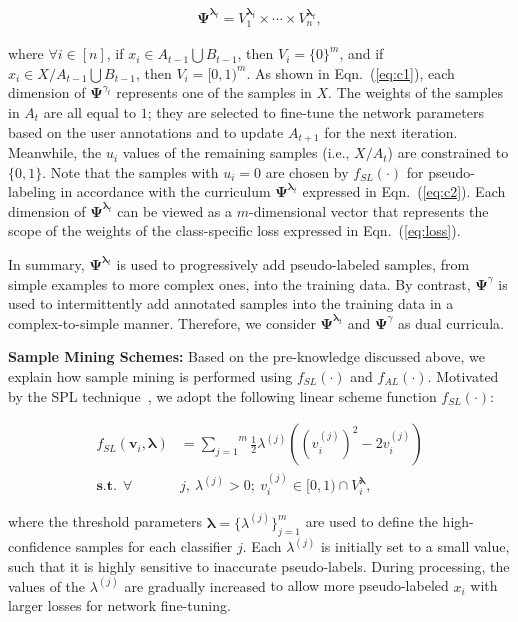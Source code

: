 \documentclass[journal]{IEEEtran}
\begin{document}
{\begin{small}\begin{equation}
\begin{aligned}
\mathbf{\Psi}^{{\bm \lambda}_t}= V^{\bm \lambda_t}_1\times\cdots\times V^{\bm \lambda_t}_n,\label{eq:c2}
\end{aligned}
\end{equation}\end{small}where $\forall i\in[n]$, if $x_i\in A_{t-1}\bigcup B_{t-1}$, then $V_i=\{0\}^m$, and if $x_i\in X/A_{t-1}\bigcup B_{t-1}$, then $V_i=[0,1)^m$. As shown in Eqn.~(\ref{eq:c1}), each dimension of $\mathbf{\Psi}^{\gamma_t}$ represents one of the samples in $X$. The weights of the samples in $A_t$ are all equal to $1$;
they are selected to fine-tune the network parameters based on the user annotations and to update $A_{t+1}$ for the next iteration. Meanwhile, the $u_i$ values of the remaining samples (i.e., $X/A_t$) are constrained to $\{0,1\}$. Note that the samples with $u_i=0$ are chosen by $f_{SL}(\cdot)$ for pseudo-labeling in accordance with the curriculum $\mathbf{\Psi}^{\bm \lambda_t}$ expressed in Eqn.~(\ref{eq:c2}). Each dimension of $\mathbf{\Psi}^{\bm \lambda_t}$ can be viewed as {a} $m$-dimensional vector that represents the scope of the weights of the class-specific loss expressed in Eqn.~(\ref{eq:loss}).} In summary, $\mathbf{\Psi}^{\bm \lambda_t}$ is used to progressively add pseudo-labeled samples, from simple examples to more complex ones, into the training data. By contrast, $\mathbf{\Psi}^{\gamma}$ is used to intermittently add annotated samples into the training data in a complex-to-simple manner. Therefore, we consider $\mathbf{\Psi}^{\bm \lambda_t}$ and $\mathbf{\Psi}^{\gamma}$ as dual curricula.


\textbf{Sample Mining Schemes:} Based on the {pre-knowledge discussed above}, we explain {how sample mining is performed} using $f_{SL}(\cdot)$ and $f_{AL}(\cdot)$. Motivated by the SPL technique~\cite{spcl}, we adopt the {following} linear scheme function $f_{SL}(\cdot)$:	

	\begin{small}
		\begin{equation}
		\label{eq:f1}
		\begin{aligned}
		f_{SL}(\mathbf{v}_i,{\bm \lambda}) &=  \overset{m}{\underset{j=1}{\sum}}\frac{1}{2}\lambda^{(j)}((v_i^{(j)})^2-2v_i^{(j)}) \\
		\mathbf{s.t.} \ \ \forall &j, \ \lambda^{(j)} > 0; \ v_i^{(j)} \in [0,1)\cap V^{\bm \lambda}_i,
		\end{aligned}
		\end{equation} 
	\end{small}where the threshold parameters ${\bm \lambda}=\{\lambda^{(j)}\}_{j=1}^m$ are used to define the high-confidence samples for each classifier $j$. Each $\lambda^{(j)}$ {is initially set to a small value}, {such that it is highly sensitive} to inaccurate pseudo-labels. {During processing, the values of the $\lambda^{(j)}$ are gradually increased} to allow more pseudo-labeled $x_i$ with larger losses for {network} fine-tuning.
\end{document}
